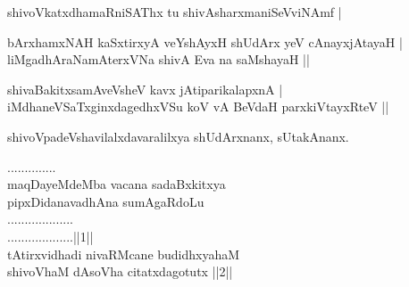 \begin{entry}
\begin{shl}
shivoVkatxdhamaRniSAThx tu shivAsharxmaniSeVviNAmf |
\end{shl}
\begin{shl}
bArxhamxNAH kaSxtirxyA veYshAyxH shUdArx yeV cAnayxjAtayaH |\\
liMgadhAraNamAterxVNa shivA Eva na saMshayaH ||
\end{shl}
\begin{shl}
shivaBakitxsamAveVsheV kavx jAtiparikalapxnA |\\
iMdhaneVSaTxginxdagedhxVSu koV vA BeVdaH parxkiVtayxRteV ||
\end{shl}
\end{entry}

\begin{entry}
\gl{}
\end{entry}

\begin{entry}
\gl{}
\begin{shl}
shivoVpadeVshavilalxdavaralilxya shUdArxnanx, sUtakAnanx.
\end{shl}
\end{entry}

\begin{entry}
\begin{shl}
..............\\
maqDayeMdeMba vacana sadaBxkitxya\\
pipxDidanavadhAna sumAgaRdoLu\\
...................\\
...................||1||\\
tAtirxvidhadi nivaRMcane budidhxyahaM\\
shivoVhaM dAsoVha citatxdagotutx ||2||
\end{shl}
\gl{}
\end{entry}

